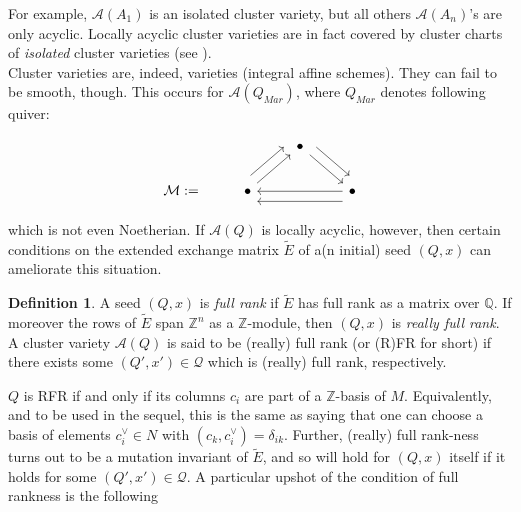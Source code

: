 \documentclass[11pt]{amsart}
\theoremstyle{definition}
\newtheorem{defn}[thm]{Definition}
\theoremstyle{remark}
\numberwithin{equation}{section}
\begin{document}
For example, $\mathcal{A}(A_1)$ is an isolated cluster variety, but all others $\mathcal{A}(A_n)$'s are only acyclic. Locally acyclic cluster varieties are in fact covered by cluster charts of \textit{isolated} cluster varieties (see \cite{Mul}).\\

Cluster varieties are, indeed, varieties (integral affine schemes). They can fail to be smooth, though. This occurs for $\mathcal{A}(Q_{Mar})$, where $Q_{Mar}$ denotes following quiver:

\[\begin{tikzcd}
	&& \bullet \\
	{\mathcal{M} :=} & \bullet && \bullet
	\arrow[from=1-3, to=2-4]
	\arrow[shift left=3, from=1-3, to=2-4]
	\arrow[from=2-2, to=1-3]
	\arrow[shift left=3, from=2-2, to=1-3]
	\arrow[from=2-4, to=2-2]
	\arrow[shift left=3, from=2-4, to=2-2]
\end{tikzcd}\]

\noindent which is not even Noetherian. If $\mathcal{A}(Q)$ is locally acyclic, however, then certain conditions on the extended exchange matrix $\tilde{E}$ of a(n initial) seed $(Q, x)$ can ameliorate this situation. %

\begin{defn}
    A seed $(Q, x)$ is \textit{full rank} if $\tilde{E}$ has full rank as a matrix over $\mathbb{Q}$. If moreover the rows of $\tilde{E}$ span $\mathbb{Z}^n$ as a $\mathbb{Z}$-module, then $(Q, x)$ is \textit{really full rank}. A cluster variety $\mathcal{A}(Q)$ is said to be (really) full rank (or (R)FR for short) if there exists some $(Q', x') \in \mathcal{Q}$ which is (really) full rank, respectively.
\end{defn}

$Q$ is RFR if and only if its columns $c_i$ are part of a $\mathbb Z$-basis of $M$. Equivalently, and to be used in the sequel, this is the same as saying that one can choose a basis of elements $c_i^\vee\in N$ with $(c_k,c_i^\vee)=\delta_{ik}$. Further, (really) full rank-ness turns out to be a mutation invariant of $\tilde{E}$, and so will hold for $(Q, x)$ itself if it holds for some $(Q', x') \in \mathcal{Q}$. A particular upshot of the condition of full rankness is the following
\end{document}
